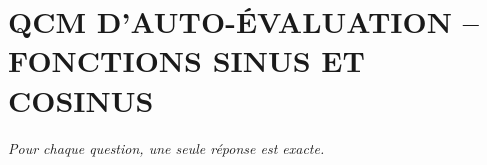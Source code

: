 
\section*{\textcolor{chapcolor}{\MakeUppercase{QCM d'auto-évaluation -- Fonctions sinus et cosinus}}}

\begin{center}
\textit{Pour chaque question, une seule réponse est exacte.}
\end{center}

